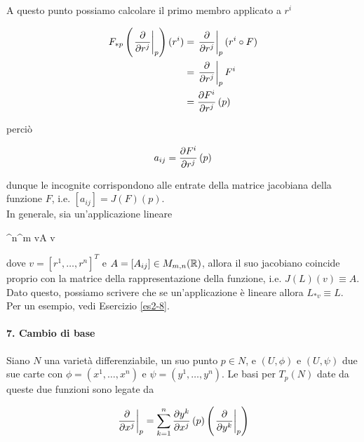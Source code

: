 A questo punto possiamo calcolare il primo membro applicato a $ r^{i} $

\begin{align}
	\begin{split}
		F_{*p} \left( \eval{ \pdv{r^{j}} }_{p} \right) (r^{i}) &= \eval{ \pdv{r^{j}} }_{p} (r^{i} \circ F)\\
		&= \eval{ \pdv{r^{j}} }_{p} F^{i}\\
		&= \pdv{F^{i}}{r^{j}} \, (p)
	\end{split}
\end{align}

perciò

\begin{equation}
	a_{ij} = \pdv{F^{i}}{r^{j}} \, (p)
\end{equation}

dunque le incognite corrispondono alle entrate della matrice jacobiana della funzione $ F $, i.e. $ [a_{ij}] = J(F)(p) $.\\
In generale, sia un'applicazione lineare

	{\R^{n}}{\R^{m}}
	{v}{A v}

dove $ v = [r^{1},\dots,r^{n}]^{T} $ e $ A = [A_{ij}] \in M_{m,n}(\mathbb{R}) $, allora il suo jacobiano coincide proprio con la matrice della rappresentazione della funzione, i.e. $ J(L)(v) \equiv A $. Dato questo, possiamo scrivere che se un'applicazione è lineare allora $ L_{*v} \equiv L $.\\
Per un esempio, vedi Esercizio \ref{es2-8}.

\paragraph{7. Cambio di base}

Siano $ N $ una varietà differenziabile, un suo punto $ p \in N $, e $ (U,\phi) $ e $ (U,\psi) $ due sue carte con $ \phi = (x^{1},\dots,x^{n}) $ e $ \psi = (y^{1},\dots,y^{n}) $. Le basi per $ T_{p}(N) $ date da queste due funzioni sono legate da

\begin{equation}
	\eval{ \pdv{x^{j}} }_{p} = \sum_{k=1}^{n} \pdv{y^{k}}{x^{j}} \, (p) \left( \eval{ \pdv{y^{k}} }_{p} \right)
\end{equation}


